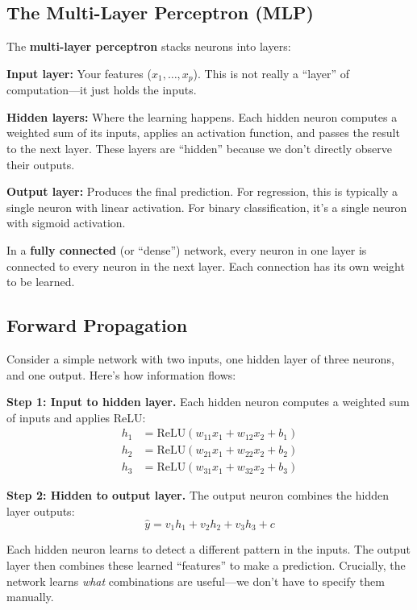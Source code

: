 \documentclass[11pt,a4paper]{article}
\newcommand{\keyword}[1]{\textbf{\textcolor{AccentOrange}{#1}}}
\begin{document}
\subsection{The Multi-Layer Perceptron (MLP)}

The \keyword{multi-layer perceptron} stacks neurons into layers:

\textbf{Input layer:} Your features ($x_1, \ldots, x_p$). This is not really a ``layer'' of computation---it just holds the inputs.

\textbf{Hidden layers:} Where the learning happens. Each hidden neuron computes a weighted sum of its inputs, applies an activation function, and passes the result to the next layer. These layers are ``hidden'' because we don't directly observe their outputs.

\textbf{Output layer:} Produces the final prediction. For regression, this is typically a single neuron with linear activation. For binary classification, it's a single neuron with sigmoid activation.

In a \keyword{fully connected} (or ``dense'') network, every neuron in one layer is connected to every neuron in the next layer. Each connection has its own weight to be learned.

\subsection{Forward Propagation}

Consider a simple network with two inputs, one hidden layer of three neurons, and one output. Here's how information flows:

\textbf{Step 1: Input to hidden layer.} Each hidden neuron computes a weighted sum of inputs and applies ReLU:
\begin{align*}
h_1 &= \text{ReLU}(w_{11}x_1 + w_{12}x_2 + b_1) \\
h_2 &= \text{ReLU}(w_{21}x_1 + w_{22}x_2 + b_2) \\
h_3 &= \text{ReLU}(w_{31}x_1 + w_{32}x_2 + b_3)
\end{align*}

\textbf{Step 2: Hidden to output layer.} The output neuron combines the hidden layer outputs:
\[
\widehat{y} = v_1 h_1 + v_2 h_2 + v_3 h_3 + c
\]

Each hidden neuron learns to detect a different pattern in the inputs. The output layer then combines these learned ``features'' to make a prediction. Crucially, the network learns \textit{what} combinations are useful---we don't have to specify them manually.
\end{document}
